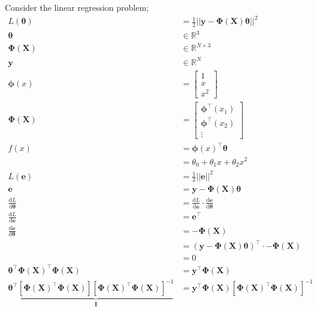 \documentclass[a4paper, 12pt]{article}
\newcommand{\dif}[2]{\frac{\mathrm{d}#1}{\mathrm{d}#2}}
\newcommand{\mat}[1]{\boldsymbol{#1}}
\renewcommand{\vec}[1]{\boldsymbol{#1}}
\begin{document}
            Consider the linear regression problem;
            \begin{align*}
                L(\vec{\theta}) & = \frac{1}{2} || \vec{y} - \mat{\Phi}(\vec{X}) \vec{\theta} ||^2 \\
                \vec{\theta} & \in \mathbb{R}^3 \\
                \mat{\Phi}(\vec{X}) & \in \mathbb{R}^{N \times 3} \\
                \vec{y} & \in \mathbb{R}^N \\
                \vec{\phi}(x) & = \begin{bmatrix}
                    1 \\ x \\ x^2
                \end{bmatrix} \\
                \mat{\Phi}(\vec{X}) & = \begin{bmatrix}
                    \vec{\phi}^\top(x_1) \\
                    \vec{\phi}^\top(x_2) \\
                    \vdots
                \end{bmatrix} \\
                f(x) & = \vec{\phi}(x)^\top\vec{\theta} \\
                & = \theta_0 + \theta_1x + \theta_2x^2 \\
                L(\vec{e}) & = \frac{1}{2} || \vec{e} ||^2 \\
                \vec{e} & = \vec{y} - \mat{\Phi}(\vec{X})\vec{\theta} \\
                \dif{L}{\vec{\theta}} & = \dif{L}{\vec{e}} \cdot \dif{\vec{e}}{\vec{\theta}} \\
                \dif{L}{\vec{e}} & = \vec{e}^\top \\
                \dif{\vec{e}}{\vec{\theta}} & = -\mat{\Phi}(\vec{X}) \\
                & = (\vec{y} - \mat{\Phi}(\vec{X})\vec{\theta})^\top \cdot - \mat{\Phi}(\vec{X}) \\
                & = 0 \\
                \vec{\theta}^\top \mat{\Phi}(\vec{X})^\top\mat{\Phi}(\vec{X}) & = \vec{y}^\top\mat{\Phi}(\vec{X}) \\
                \vec{\theta}^\top \underbrace{[\mat{\Phi}(\vec{X})^\top\mat{\Phi}(\vec{X})][\mat{\Phi}(\vec{X})^\top\mat{\Phi}(\vec{X})]^{-1}}_{\mat{I}} & = \vec{y}^\top\mat{\Phi}(\vec{X})[\mat{\Phi}(\vec{X})^\top\mat{\Phi}(\vec{X})]^{-1}
            \end{align*}
\end{document}
